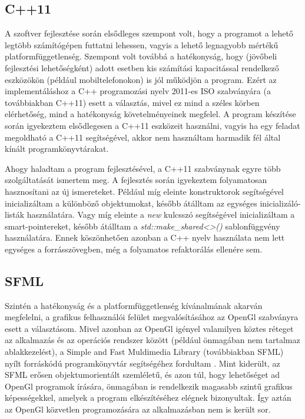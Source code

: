 \documentclass[12pt, twoside]{report}
\begin{document}
\subsection{C++11}

A szoftver fejlesztése során elsődleges szempont volt, hogy a programot a lehető legtöbb számítógépen futtatni lehessen, vagyis a lehető legnagyobb mértékű platformfüggetlenség. Szempont volt továbbá a hatékonyság, hogy (jövőbeli fejlesztési lehetőségként) adott esetben kis számítási kapacitással rendelkező eszközökön (például mobiltelefonokon) is jól működjön a program. Ezért az implementáláshoz a C++ programozási nyelv 2011-es ISO szabványára (a továbbiakban C++11) esett a választás, mivel ez mind a széles körben elérhetőség, mind a hatékonyság követelményeinek megfelel. A program készítése során igyekeztem elsődlegesen a C++11 eszközeit használni, vagyis ha egy feladat megoldható a C++11 segítségével, akkor nem használtam harmadik fél által kínált programkönyvtárakat.

Ahogy haladtam a program fejlesztésével, a C++11 szabványnak egyre több szolgáltatását ismertem meg. A fejlesztés során igyekeztem folyamatosan hasznosítani az új ismereteket. Például míg eleinte konstruktorok segítségével inicializáltam a különböző objektumokat, később átálltam az egységes inicializáló-listák használatára. Vagy míg eleinte a \emph{new} kulcsszó segítségével inicializáltam a smart-pointereket, később átálltam a \emph{std::make\_shared\textless\textgreater()} sablonfüggvény használatára. Ennek köszönhetően azonban a C++ nyelv használata nem lett egységes a forrásszövegben, még a folyamatos refaktorálás ellenére sem.

\subsection{SFML}

Szintén a hatékonyság és a platformfüggetlenség kívánalmának akarván megfelelni, a grafikus felhasználói felület megvalósításához az OpenGl szabványra esett a választásom. Mivel azonban az OpenGl igényel valamilyen köztes réteget az alkalmazás és az operációs rendszer között (például önmagában nem tartalmaz ablakkezelést), a Simple and Fast Muldimedia Library (továbbiakban SFML) nyílt forráskódú programkönyvtár segítségéhez fordultam \cite{sfml}. Mint kiderült, az SFML erősen objektumorientált szemléletű, és azon túl, hogy lehetőséget ad OpenGl programok írására, önmagában is rendelkezik magasabb szintű grafikus képességekkel, amelyek a program elkészítéséhez elégnek bizonyultak. Így aztán az OpenGl közvetlen programozására az alkalmazásban nem is került sor. 
\end{document}
